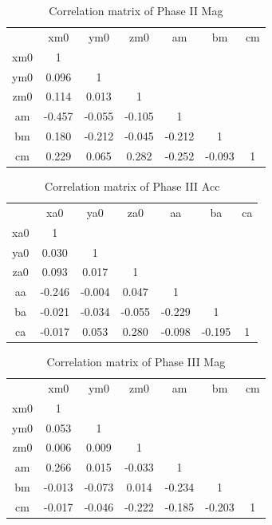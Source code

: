 \begin{table}
    \centering
    \begin{tabular}{c|c|c|c|c|c|c}
             &   xm0  & ym0    &   zm0  &   am   &   bm   & cm \\
         xm0 &  1     &        &        &        &        &    \\
         ym0 &  0.096 &  1     &        &        &        &    \\
         zm0 &  0.114 &  0.013 &  1     &        &        &    \\
         am  & -0.457 & -0.055 & -0.105 &  1     &        &    \\
         bm  &  0.180 & -0.212 & -0.045 & -0.212 &  1     &    \\
         cm  &  0.229 &  0.065 &  0.282 & -0.252 & -0.093 & 1  \\
    \end{tabular}
    \caption{Correlation matrix of Phase II Mag}
    \label{tab:my_label}
\end{table}

\begin{table}
    \centering
    \begin{tabular}{c|c|c|c|c|c|c}
             &   xa0  &   ya0  &   za0  &   aa   &   ba   & ca \\
         xa0 &  1     &        &        &        &        &    \\
         ya0 &  0.030 &  1     &        &        &        &    \\
         za0 &  0.093 &  0.017 &  1     &        &        &    \\
         aa  & -0.246 & -0.004 &  0.047 &  1     &        &    \\
         ba  & -0.021 & -0.034 & -0.055 & -0.229 &  1     &    \\
         ca  & -0.017 &  0.053 &  0.280 & -0.098 & -0.195 &  1 \\
    \end{tabular}
    \caption{Correlation matrix of Phase III Acc}
    \label{tab:my_label}
\end{table}

\begin{table}
    \centering
    \begin{tabular}{c|c|c|c|c|c|c}
             &   xm0  & ym0    &   zm0  &   am   &   bm   & cm \\
         xm0 &  1     &        &        &        &        &    \\
         ym0 &  0.053 &  1     &        &        &        &    \\
         zm0 &  0.006 &  0.009 &  1     &        &        &    \\
         am  &  0.266 &  0.015 & -0.033 &  1     &        &    \\
         bm  & -0.013 & -0.073 &  0.014 & -0.234 &  1     &    \\
         cm  & -0.017 & -0.046 & -0.222 & -0.185 & -0.203 & 1  \\
    \end{tabular}
    \caption{Correlation matrix of Phase III Mag}
    \label{tab:my_label}
\end{table}

